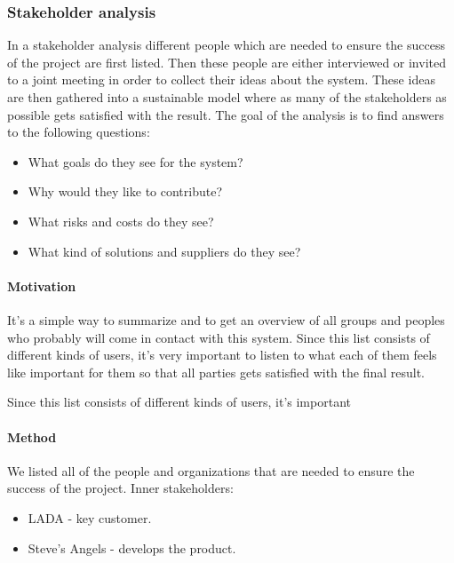 \documentclass[10pt]{article}
\begin{document}
\subsubsection{Stakeholder analysis}
In a stakeholder analysis different people which are needed to ensure the success of the project are first listed. Then these people are either interviewed or invited to a joint meeting in order to collect their ideas about the system. These ideas are then gathered into a sustainable model where as many of the stakeholders as possible gets satisfied with the result. The goal of the analysis is to find answers to the following questions:
\begin{itemize}
\item What goals do they see for the system?
\item Why would they like to contribute?
\item What risks and costs do they see?
\item What kind of solutions and suppliers do they see?
\end{itemize}

\paragraph[5pt]{Motivation}
\hfill \break
It’s a simple way to summarize and to get an overview of all groups and peoples who probably will come in contact with this system. Since this list consists of different kinds of users, it's very important to listen to what each of them feels like important for them so that all parties gets satisfied with the final result.

Since this list consists of different kinds of users, it's important 
\paragraph{Method}
\hfill \break
We listed all of the people and organizations that are needed to ensure the success of the project. 
Inner stakeholders:
\begin{itemize}
\item LADA - key customer. 
\item Steve's Angels - develops the product. 
\end{itemize}
\end{document}
